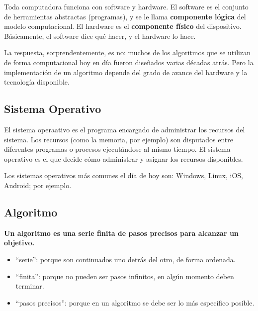 \documentclass[
  letterpaper,
  DIV=11,
  numbers=noendperiod]{scrreprt}
\providecommand{\tightlist}{%
  \setlength{\itemsep}{0pt}\setlength{\parskip}{0pt}}\usepackage{longtable,booktabs,array}
\begin{document}
Toda computadora funciona con software y hardware. El software es el
conjunto de herramientas abstractas (programas), y se le llama
\textbf{componente lógica} del modelo computacional. El hardware es el
\textbf{componente físico} del dispositivo. Básicamente, el software
dice qué hacer, y el hardware lo hace.

\begin{tcolorbox}[enhanced jigsaw, colframe=quarto-callout-tip-color-frame, opacityback=0, opacitybacktitle=0.6, bottomrule=.15mm, toprule=.15mm, coltitle=black, breakable, colback=white, leftrule=.75mm, titlerule=0mm, bottomtitle=1mm, toptitle=1mm, rightrule=.15mm, title=\textcolor{quarto-callout-tip-color}{\faLightbulb}\hspace{0.5em}{\textbf{¿Es indispensable tener una computadora para crear un
algoritmo?}\\
}, arc=.35mm, left=2mm, colbacktitle=quarto-callout-tip-color!10!white]

La respuesta, sorprendentemente, es no: muchos de los algoritmos que se
utilizan de forma computacional hoy en día fueron diseñados varias
décadas atrás. Pero la implementación de un algoritmo depende del grado
de avance del hardware y la tecnología disponible.

\end{tcolorbox}

\hypertarget{sistema-operativo}{%
\subsection{Sistema Operativo}\label{sistema-operativo}}

El sistema operaativo es el programa encargado de administrar los
recursos del sistema. Los recursos (como la memoria, por ejemplo) son
disputados entre diferentes programas o procesos ejecutándose al mismo
tiempo. El sistema operativo es el que decide cómo administrar y asignar
los recursos disponibles.

Los sistemas operativos más comunes el día de hoy son: Windows, Linux,
iOS, Android; por ejemplo.

\hypertarget{algoritmo}{%
\subsection{Algoritmo}\label{algoritmo}}

\textbf{Un algoritmo es una serie finita de pasos precisos para alcanzar
un objetivo.}

\begin{itemize}
\tightlist
\item
  ``serie'': porque son continuados uno detrás del otro, de forma
  ordenada.
\item
  ``finita'': porque no pueden ser pasos infinitos, en algún momento
  deben terminar.
\item
  ``pasos precisos'': porque en un algoritmo se debe ser lo más
  específico posible.
\end{itemize}
\end{document}
